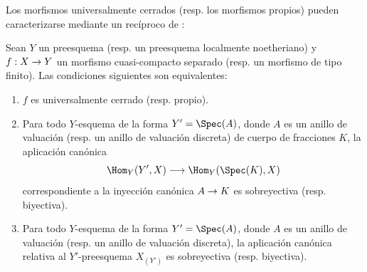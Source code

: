 \documentclass[oneside,10pt]{amsart}
\makeatletter
\newcommand{\ega@arrow}[2]{\mathchoice{#1}{#2}{#2}{#2}}
\renewcommand{\to}{\ega@arrow{\longrightarrow}{\rightarrow}}
\newcommand{\oldpage}[2][]{\marginnote{\normalfont\footnotesize\textbf{#1}~|~#2}\ignorespaces}
\let\EGAOriginalLabel\label
\renewcommand{\label}[1]{\phantomsection\EGAOriginalLabel{#1}}
\makeatother
\begin{document}

Los morfismos universalmente cerrados (resp. los morfismos propios) pueden caracterizarse mediante un recíproco de :

\begin{theorem}[7.3.8]
\label{II.7.3.8}
Sean $Y$ un preesquema \textup{(resp.} un preesquema localmente noetheriano\textup{)} y $f:X\to Y$ un morfismo cuasi-compacto separado \textup{(resp.} un morfismo de tipo finito\textup{)}.
Las condiciones siguientes son equivalentes:
\begin{enumerate}
  \item[\rm{(a)}] $f$ es universalmente cerrado \textup{(resp.} propio\textup{)}.
  \item[\rm{(b)}] Para todo $Y$-esquema de la forma $Y'=\Spec(A)$, donde $A$ es un anillo de valuación \textup{(resp.} un anillo de valuación discreta) de cuerpo de fracciones $K$, la aplicación canónica
  \[
    \Hom_Y(Y',X)\longrightarrow\Hom_Y(\Spec(K),X)
  \]
  correspondiente a la inyección canónica $A\to K$ es sobreyectiva \textup{(resp.} biyectiva\textup{)}.
\oldpage[II]{145}
  \item[\rm{(c)}] Para todo $Y$-esquema de la forma $Y'=\Spec(A)$, donde $A$ es un anillo de valuación \textup{(resp.} un anillo de valuación discreta), la aplicación canónica \textup{} relativa al $Y'$-preesquema $X_{(Y')}$ es sobreyectiva \textup{(resp.} biyectiva).
\end{enumerate}
\end{theorem}
\end{document}
